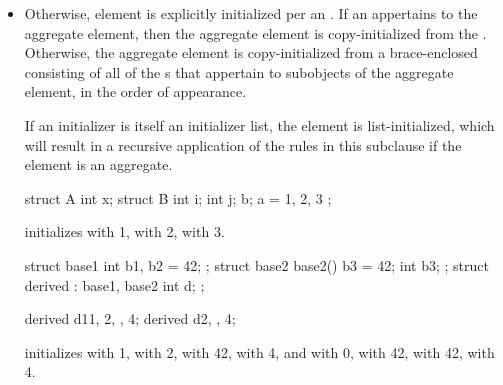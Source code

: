 \begin{itemize}
\begin{example}
\begin{codeblock}
// the  element is initialized from 
// which leads to its  element being initialized from 
C y = C{.a=2, .b=3, .c=4};
\end{codeblock}
\end{example}
\item
Otherwise,
element is explicitly initialized per an .
If an  appertains to the aggregate element,
then the aggregate element is copy-initialized from the .
Otherwise,
the aggregate element is copy-initialized
from a brace-enclosed 
consisting of all of the s
that appertain to subobjects of the aggregate element,
in the order of appearance.
\begin{note}
If an initializer is itself an initializer list,
the element is list-initialized, which will result in a recursive application
of the rules in this subclause if the element is an aggregate.
\end{note}
\begin{example}
\begin{codeblock}
struct A {
  int x;
  struct B {
    int i;
    int j;
  } b;
} a = { 1, { 2, 3 } };
\end{codeblock}
initializes
with 1,
with 2,
with 3.

\begin{codeblock}
struct base1 { int b1, b2 = 42; };
struct base2 {
  base2() {
    b3 = 42;
  }
  int b3;
};
struct derived : base1, base2 {
  int d;
};

derived d1{{1, 2}, {}, 4};
derived d2{{}, {}, 4};
\end{codeblock}
initializes
 with 1,
 with 2,
 with 42,
 with 4, and
 with 0,
 with 42,
 with 42,
 with 4.
\end{example}
\end{itemize}

